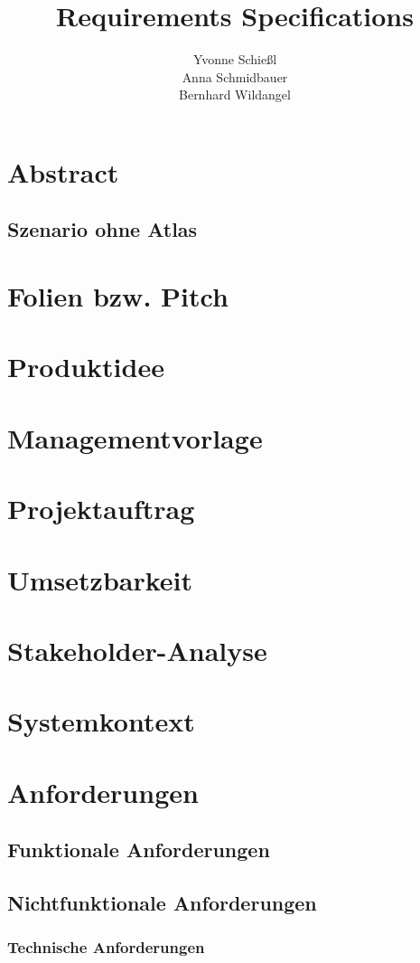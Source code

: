 \documentclass[a4paper, 12pp]{article}
\title{\textbf{Requirements Specifications}}
\author{ Yvonne Schießl \\
		Anna Schmidbauer\\
		Bernhard Wildangel}
\date{}
\begin{document}
\maketitle
\tableofcontents
\newpage
\section{Abstract}
\subsection{Szenario ohne Atlas}

\section{Folien bzw. Pitch}
\section{Produktidee}
\section{Managementvorlage}
\section{Projektauftrag}
\section{Umsetzbarkeit}
\section{Stakeholder-Analyse}
\section{Systemkontext}
\section{Anforderungen}
\subsection{Funktionale Anforderungen}
\subsection{Nichtfunktionale Anforderungen}
\subsubsection{Technische Anforderungen}
\end{document}
